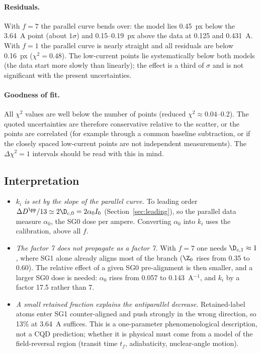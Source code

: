 \paragraph{Residuals.} With $f=7$ the parallel curve bends over: the model lies 0.45~px below the
3.64~A point (about $1\sigma$) and 0.15--0.19~px above the data at 0.125 and 0.431~A. With $f=1$ the
parallel curve is nearly straight and all residuals are below 0.16~px ($\chi^2=0.48$). The
low-current points lie systematically below both models (the data start more slowly than linearly);
the effect is a third of $\sigma$ and is not significant with the present uncertainties.

\paragraph{Goodness of fit.} All $\chi^2$ values are well below the number of points (reduced
$\chi^2\approx0.04$--0.2). The quoted uncertainties are therefore conservative relative to the scatter,
or the points are correlated (for example through a common baseline subtraction, or if the closely
spaced low-current points are not independent measurements). The $\Delta\chi^2=1$ intervals should be
read with this in mind.

\subsection{Interpretation}
\begin{itemize}
\item \emph{$k_i$ is set by the slope of the parallel curve.} To leading order
$\Delta D^\pp/13\simeq2\D_{c,0}=2\alpha_0I_0$ (Section~\ref{sec:leading}), so the parallel data measure
$\alpha_0$, the SG0 dose per ampere. Converting $\alpha_0$ into $k_i$ uses the calibration, above all
$f$.
\item \emph{The factor 7 does not propagate as a factor 7.} With $f=7$ one needs $\D_{c,1}\approx1$,
where SG1 alone already aligns most of the branch ($\Z_0$ rises from 0.35 to 0.60). The relative effect
of a given SG0 pre-alignment is then smaller, and a larger SG0 dose is needed: $\alpha_0$ rises from
0.057 to 0.143~A$^{-1}$, and $k_i$ by a factor 17.5 rather than 7.
\item \emph{A small retained fraction explains the antiparallel decrease.} Retained-label atoms enter
SG1 counter-aligned and push strongly in the wrong direction, so 13\% at 3.64~A suffices. This is a
one-parameter phenomenological description, not a CQD prediction; whether it is physical must come
from a model of the field-reversal region (transit time $t_f$, adiabaticity, nuclear-angle motion).
\end{itemize}

